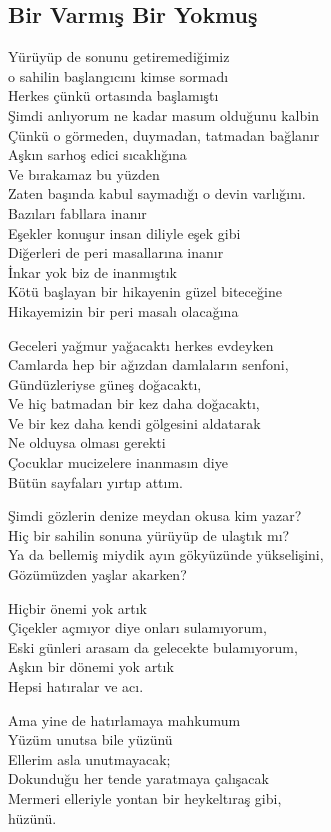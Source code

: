 \subsection{Bir Varmış Bir Yokmuş}

Yürüyüp de sonunu getiremediğimiz \\
o sahilin başlangıcını kimse sormadı \\
Herkes çünkü ortasında başlamıştı \\
Şimdi anlıyorum ne kadar masum olduğunu kalbin \\
Çünkü o görmeden, duymadan, tatmadan bağlanır \\
Aşkın sarhoş edici sıcaklığına \\
Ve bırakamaz bu yüzden \\
Zaten başında kabul saymadığı o devin varlığını. \\

\noindent\newline
Bazıları fabllara inanır \\
Eşekler konuşur insan diliyle eşek gibi \\
Diğerleri de peri masallarına inanır \\
İnkar yok biz de inanmıştık \\
Kötü başlayan bir hikayenin güzel biteceğine \\
Hikayemizin bir peri masalı olacağına

\noindent\newline
Geceleri yağmur yağacaktı herkes evdeyken \\
Camlarda hep bir ağızdan damlaların senfoni, \\
Gündüzleriyse güneş doğacaktı, \\
Ve hiç batmadan bir kez daha doğacaktı, \\
Ve bir kez daha kendi gölgesini aldatarak \\
Ne olduysa olması gerekti \\
Çocuklar mucizelere inanmasın diye \\
Bütün sayfaları yırtıp attım.

\noindent\newline
Şimdi gözlerin denize meydan okusa kim yazar? \\
Hiç bir sahilin sonuna yürüyüp de ulaştık mı? \\
Ya da bellemiş miydik ayın gökyüzünde yükselişini, \\
Gözümüzden yaşlar akarken?

\noindent\newline
Hiçbir önemi yok artık \\
Çiçekler açmıyor diye onları sulamıyorum, \\
Eski günleri arasam da gelecekte bulamıyorum, \\
Aşkın bir dönemi yok artık \\
Hepsi hatıralar ve acı.

\noindent\newline
Ama yine de hatırlamaya mahkumum \\
Yüzüm unutsa bile yüzünü \\
Ellerim asla unutmayacak; \\
Dokunduğu her tende yaratmaya çalışacak \\
Mermeri elleriyle yontan bir heykeltıraş gibi, \\
	hüzünü.